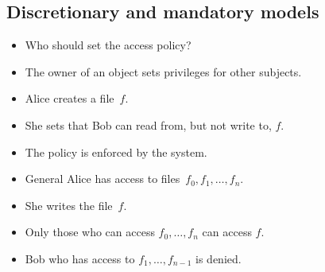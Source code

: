 \subsection{Discretionary and mandatory models}

\begin{frame}
  \begin{question}
    \begin{itemize}
      \item Who should set the access policy?
    \end{itemize}
  \end{question}
\end{frame}

\begin{frame}
  \begin{definition}
    \begin{itemize}
      \item The owner of an object sets privileges for other subjects.
    \end{itemize}
  \end{definition}

  \pause

  \begin{example}
    \begin{itemize}
      \item Alice creates a file~\(f\).
      \item She sets that Bob can read from, but not write to, \(f\).
    \end{itemize}
  \end{example}
\end{frame}

\begin{frame}
  \begin{definition}
    \begin{itemize}
      \item The policy is enforced by the system.
    \end{itemize}
  \end{definition}

  \pause

  \begin{example}
    \begin{itemize}
      \item General Alice has access to files~\(f_0, f_1, \dotsc, f_n\).
      \item She writes the file~\(f\).
      \item Only those who can access \(f_0, \dotsc, f_n\) can access \(f\).
      \item Bob who has access to \(f_1, \dotsc, f_{n-1}\) is denied.
    \end{itemize}
  \end{example}
\end{frame}

